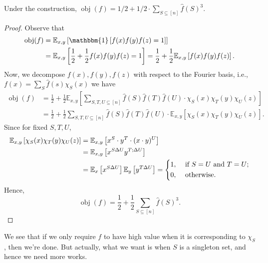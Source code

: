 \begin{theorem}[\cite{10.1145/100216.100225}]\label{thm:BLR}
	Under the construction, \(\mathop{\mathrm{obj}}(f) = 1 / 2 + 1 / 2 \cdot \sum_{S \subseteq [n]} \hat{f} (S)^3 \).
\end{theorem}
\begin{proof}
	Observe that
	\[
		\begin{split}
			\mathop{\mathrm{obj}}(f)
			&= \mathbb{E}_{x, y}\left[\mathbbm{1}\left[ f(x)f(y)f(z) = 1 \right] \right]\\
			&= \mathbb{E}_{x, y}\left[\frac{1}{2} + \frac{1}{2} f(x)f(y)f(z) = 1 \right]
			= \frac{1}{2} + \frac{1}{2} \mathbb{E}_{x, y}\left[f(x)f(y)f(z) \right].
		\end{split}
	\]
	Now, we decompose \(f(x), f(y), f(z)\) with respect to the Fourier basis, i.e., \(f(x) = \sum_{S} \hat{f} (s)\chi _S(x)\) we have
	\[
		\begin{split}
			\mathop{\mathrm{obj}}(f)
			&= \frac{1}{2} + \frac{1}{2} \mathbb{E}_{x, y}\left[\sum_{S, T, U \subseteq [n]} \hat{f} (S)\hat{f} (T)\hat{f} (U) \cdot \chi _S(x) \chi _T(y) \chi _U(z)\right]\\
			&= \frac{1}{2} + \frac{1}{2} \sum_{S, T, U \subseteq [n]} \hat{f} (S)\hat{f} (T)\hat{f} (U) \cdot \mathbb{E}_{x, y}\left[\chi _S(x) \chi _T(y) \chi _U(z)\right].
		\end{split}
	\]
	Since for fixed \(S, T, U\),
	\[
		\begin{split}
			\mathbb{E}_{x, y}\left[\chi _S(x) \chi _T(y) \chi _U(z)\right]
			&= \mathbb{E}_{x, y}\left[x^S\cdot y^T\cdot (x\cdot y)^U \right]\\
			&= \mathbb{E}_{x, y}\left[x^{S \Delta U} y^{T;\Delta U} \right]\\
			&= \mathbb{E}_{x}\left[x^{S \Delta U} \right] \mathbb{E}_{y}\left[y^{T \Delta U} \right]
			= \begin{dcases}
				1, & \text{ if } S=U \text{ and } T=U ; \\
				0, & \text{ otherwise} .
			\end{dcases}
		\end{split}
	\]
	Hence,
	\[
		\mathop{\mathrm{obj}}(f)
		= \frac{1}{2} + \frac{1}{2} \sum_{S \subseteq [n]} \hat{f} (S)^3 .
	\]
\end{proof}

We see that if we only require \(f\) to have high value when it is corresponding to \(\chi _S\), then we're done. But actually, what we want is when \(S\) is a singleton set, and hence we need more works.

